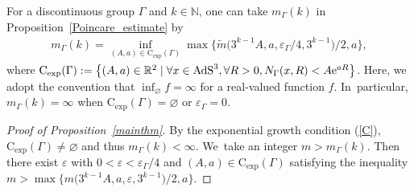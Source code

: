 For a discontinuous group $\Gamma$ and $k\in \mathbb{N}$,
one can take $m_{\Gamma}(k)$ in Proposition~\ref{Poincare_estimate} by
\begin{gather}
\label{Poincare_estimate}
m_{\Gamma}(k)=\inf_{(A,a)\in \mathrm{C_{exp}}(\Gamma)}
\max\big\{\tilde{m}\big(3^{k-1}A,a,\varepsilon_{\Gamma}/4,3^{k-1}\big)/2,a\big\},
\end{gather}
where $\mathrm{C_{exp}}(\Gamma):=\big\{(A,a)\in \mathbb{R}^{2} \mid
\forall x\in \mathrm{AdS}^{3},\forall R>0, N_{\Gamma}(x,R) < A{\rm e}^{aR}\big\}$.
Here,
we adopt the convention that $\inf_{\varnothing} f =\infty$ for a real-valued function $f$. In~particular,
$m_{\Gamma}(k)=\infty$ when $\mathrm{C_{exp}}(\Gamma)=\varnothing$
or $\varepsilon_{\Gamma}=0$.
\begin{proof}[Proof of Proposition~\ref{mainthm}]
By the exponential growth condition (\ref{C}), $\mathrm{C_{exp}}(\Gamma)\neq\varnothing$
and thus $m_{\Gamma}(k)<\infty$. We~take an integer $m >m_{\Gamma}(k)$.
Then there exist $\varepsilon$ with $0<\varepsilon<\varepsilon_{\Gamma}/4$
and $(A,a)\in\mathrm{C_{exp}}(\Gamma)$
satisfying the inequality
$m > \max\big\{m\big(3^{k-1}A,a,\varepsilon,3^{k-1}\big)/2,a\big\}$.


\end{proof}
